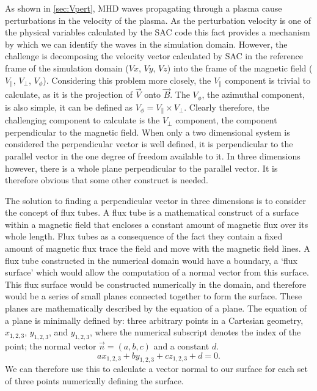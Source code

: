 As shown in \cref{sec:Vpert}, MHD waves propagating through a plasma cause perturbations in the velocity of the plasma.
As the perturbation velocity is one of the physical variables calculated by the SAC code this fact provides a mechanism by which we can identify the waves in the simulation domain.
However, the challenge is decomposing the velocity vector calculated by SAC in the reference frame of the simulation domain ($Vx$, $Vy$, $Vz$) into the frame of the magnetic field ($V_\parallel$, $V_\perp$, $V_\phi$).
Considering this problem more closely, the $V_\parallel$ component is trivial to calculate, as it is the projection of $\vec{V}$ onto $\vec{B}$.
The $V_\phi$, the azimuthal component, is also simple, it can be defined as $V_\phi = V_\parallel \times V_\perp$.
Clearly therefore, the challenging component to calculate is the $V_\perp$ component, the component perpendicular to the magnetic field.
When only a two dimensional system is considered the perpendicular vector is well defined, it is perpendicular to the parallel vector in the one degree of freedom available to it.
In three dimensions however, there is a whole plane perpendicular to the parallel vector.
It is therefore obvious that some other construct is needed.

The solution to finding a perpendicular vector in three dimensions is to consider the concept of flux tubes.
A flux tube is a mathematical construct of a surface within a magnetic field that encloses a constant amount of magnetic flux over its whole length.
Flux tubes as a consequence of the fact they contain a fixed amount of magnetic flux trace the field and move with the magnetic field lines.
A flux tube constructed in the numerical domain would have a boundary, a `flux surface' which would allow the computation of a normal vector from this surface.
This flux surface would be constructed numerically in the domain, and therefore would be a series of small planes connected together to form the surface.
These planes are mathematically described by the equation of a plane.
The equation of a plane is minimally defined by: three arbitrary points in a Cartesian geometry, $x_{1,2,3}$, $y_{1,2,3}$, and $y_{1,2,3}$, where the numerical subscript denotes the index of the point; the normal vector $\vec{n}=(a,b,c)$ and a constant $d$.
\begin{equation}
	ax_{1,2,3}+by_{1,2,3}+cz_{1,2,3}+d=0.
\end{equation}
We can therefore use this to calculate a vector normal to our surface for each set of three points numerically defining the surface.

